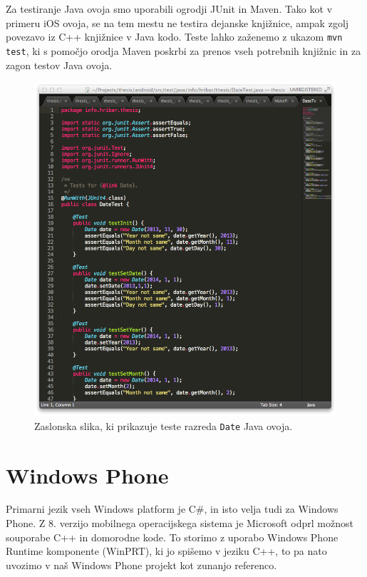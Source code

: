 Za testiranje Java ovoja smo uporabili ogrodji JUnit\cite{junit} in Maven\cite{maven}. Tako kot v primeru iOS ovoja, se na tem mestu ne testira dejanske knjižnice, ampak zgolj povezavo iz C++ knjižnice v Java kodo. Teste lahko zaženemo z ukazom \texttt{mvn test}, ki s pomočjo orodja Maven poskrbi za prenos vseh potrebnih knjižnic in za zagon testov Java ovoja.

\begin{figure}
 \includegraphics[width=\linewidth]{java-tests}
 \caption{Zaslonska slika, ki prikazuje teste razreda \texttt{Date} Java ovoja.}
 \label{fig:java-tests}
\end{figure}

\section{Windows Phone}

Primarni jezik vseh Windows platform je C\#, in isto velja tudi za Windows Phone. Z 8. verzijo mobilnega operacijskega sistema je Microsoft odprl možnost souporabe C++ in domorodne kode. To storimo z uporabo Windows Phone Runtime komponente (WinPRT), ki jo spišemo v jeziku C++, to pa nato uvozimo v naš Windows Phone projekt kot zunanjo referenco.


